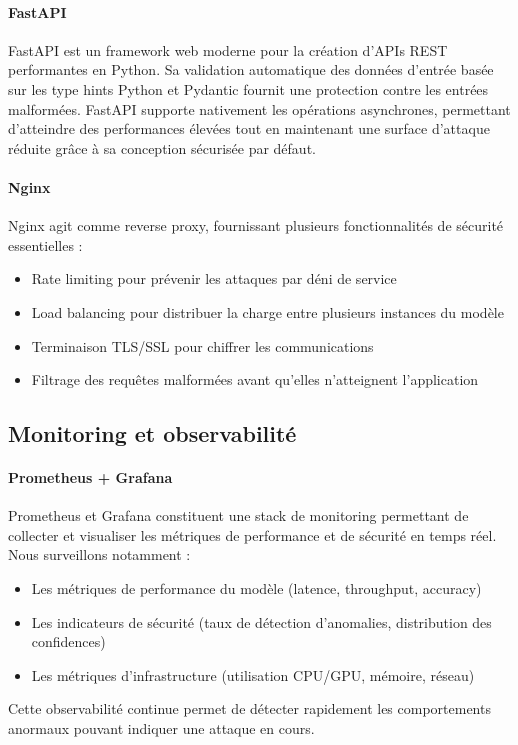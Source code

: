 \paragraph{FastAPI}
FastAPI est un framework web moderne pour la création d'APIs REST performantes en Python. Sa validation automatique des données d'entrée basée sur les type hints Python et Pydantic fournit une protection contre les entrées malformées. FastAPI supporte nativement les opérations asynchrones, permettant d'atteindre des performances élevées tout en maintenant une surface d'attaque réduite grâce à sa conception sécurisée par défaut.

\paragraph{Nginx}
Nginx agit comme reverse proxy, fournissant plusieurs fonctionnalités de sécurité essentielles :
\begin{itemize}
    \item Rate limiting pour prévenir les attaques par déni de service
    \item Load balancing pour distribuer la charge entre plusieurs instances du modèle
    \item Terminaison TLS/SSL pour chiffrer les communications
    \item Filtrage des requêtes malformées avant qu'elles n'atteignent l'application
\end{itemize}

\subsection{Monitoring et observabilité}

\paragraph{Prometheus + Grafana}
Prometheus et Grafana constituent une stack de monitoring permettant de collecter et visualiser les métriques de performance et de sécurité en temps réel. Nous surveillons notamment :
\begin{itemize}
    \item Les métriques de performance du modèle (latence, throughput, accuracy)
    \item Les indicateurs de sécurité (taux de détection d'anomalies, distribution des confidences)
    \item Les métriques d'infrastructure (utilisation CPU/GPU, mémoire, réseau)
\end{itemize}
Cette observabilité continue permet de détecter rapidement les comportements anormaux pouvant indiquer une attaque en cours.

